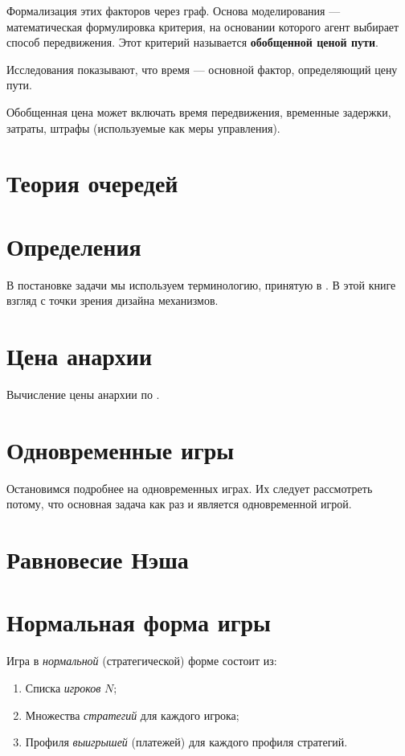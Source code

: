 Формализация этих факторов через граф.
Основа моделирования — математическая формулировка критерия, на основании которого агент выбирает способ передвижения. Этот критерий называется \textbf{обобщенной ценой пути}.

Исследования показывают, что время --- основной фактор, определяющий цену пути.\cite[4]{matmod_shvetsov}

Обобщенная цена может включать время передвижения, временные задержки, затраты, штрафы (используемые как меры управления).


\section{Теория очередей}


\section{Определения}
В постановке задачи мы используем терминологию, принятую в \cite[с. 461, Tim Roughgarden, Routing games]{agt2007}.
В этой книге взгляд с точки зрения дизайна механизмов.

\section{Цена анархии}
\cite{rough2001}
\cite{rough2005}

Вычисление цены анархии по \cite[69]{rough2005}.



\section{Одновременные игры}

Остановимся подробнее на одновременных играх. Их следует рассмотреть потому, что основная задача как раз и является одновременной игрой.




\section{Равновесие Нэша}

\section{Нормальная форма игры}
Игра в \textit{нормальной} (стратегической) форме состоит из:
\begin{enumerate}
	\item Списка \textit{игроков} $N$;
	\item Множества \textit{стратегий} для каждого игрока;
	\item Профиля \textit{выигрышей} (платежей) для каждого профиля стратегий.
\end{enumerate}

